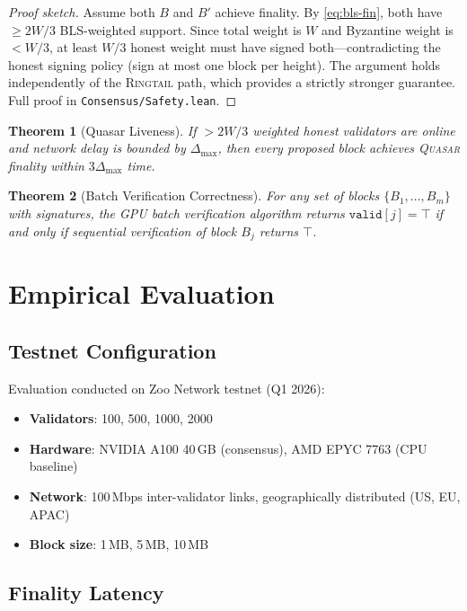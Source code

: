 \documentclass[11pt,letterpaper]{article}
\newtheorem{theorem}{Theorem}
\theoremstyle{definition}
\theoremstyle{remark}
\newcommand{\Quasar}{\textsc{Quasar}}
\newcommand{\Ringtail}{\textsc{Ringtail}}
\begin{document}
\begin{proof}[Proof sketch]
Assume both $B$ and $B'$ achieve finality. By \eqref{eq:bls-fin}, both have $\geq 2W/3$ BLS-weighted support. Since total weight is $W$ and Byzantine weight is $< W/3$, at least $W/3$ honest weight must have signed both---contradicting the honest signing policy (sign at most one block per height). The argument holds independently of the \Ringtail{} path, which provides a strictly stronger guarantee. Full proof in \texttt{Consensus/Safety.lean}.
\end{proof}

\begin{theorem}[Quasar Liveness]
\label{thm:liveness}
If $> 2W/3$ weighted honest validators are online and network delay is bounded by $\Delta_{\max}$, then every proposed block achieves \Quasar{} finality within $3\Delta_{\max}$ time.
\end{theorem}

\begin{theorem}[Batch Verification Correctness]
\label{thm:batch}
For any set of blocks $\{B_1, \ldots, B_m\}$ with signatures, the GPU batch verification algorithm returns $\texttt{valid}[j] = \top$ if and only if sequential verification of block $B_j$ returns $\top$.
\end{theorem}

\section{Empirical Evaluation}

\subsection{Testnet Configuration}

Evaluation conducted on Zoo Network testnet (Q1 2026):
\begin{itemize}
\item \textbf{Validators}: 100, 500, 1000, 2000
\item \textbf{Hardware}: NVIDIA A100 40\,GB (consensus), AMD EPYC 7763 (CPU baseline)
\item \textbf{Network}: 100\,Mbps inter-validator links, geographically distributed (US, EU, APAC)
\item \textbf{Block size}: 1\,MB, 5\,MB, 10\,MB
\end{itemize}

\subsection{Finality Latency}
\end{document}
